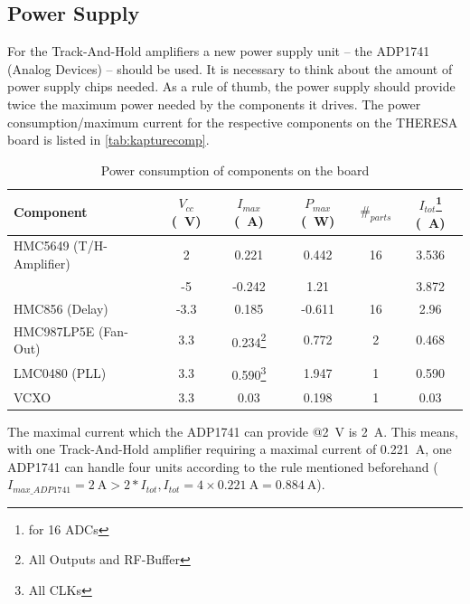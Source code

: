 

\subsection{Power Supply}
For the Track-And-Hold amplifiers a new power supply unit -- the ADP1741 (Analog Devices) -- should be used. It is necessary to think about the amount of power supply chips needed. As a rule of thumb, the power supply should provide twice the maximum power needed by the components it drives. The power consumption/maximum current for the respective components on the THERESA board is listed in \autoref{tab:kapturecomp}. 
\begin{table}[tbh!]
	\caption{Power consumption of components on the board}
	\label{tab:kapturecomp}
	\begin{minipage}{\textwidth}
		\centering
		\begin{tabularx}{\textwidth}{XSSSSS}
			\toprule
			\textbf{Component} & \textbf{$V_{cc}$ (\SI{}{\volt})} & \textbf{$I_{max}$ (\SI{}{\ampere})} & \textbf{$P_{max}$ (\SI{}{\watt})} & $\#_{parts}$ & \textbf{$I_{tot}$}\footnote{for 16 ADCs} (\SI{}{\ampere})\\
				\midrule
			HMC5649 (T/H-Amplifier) 	& 2	  	& 0.221 	 & 0.442 & 16 & 3.536\\
									& -5  	& -0.242 & 1.21 &  & 3.872\\
			HMC856 (Delay) 			& -3.3	& 0.185 & -0.611 & 16 & 2.96\\
			HMC987LP5E (Fan-Out) 	& 3.3 	& 0.234\footnote{All Outputs and RF-Buffer} & 0.772 & 2 & 0.468\\
			LMC0480 (PLL) 			& 3.3 	& 0.590\footnote{All CLKs} & 1.947 & 1 & 0.590\\
			VCXO 					& 3.3 	& 0.03 & 0.198 & 1 & 0.03\\
			\bottomrule
		\end{tabularx}
	\end{minipage}
\end{table}

The maximal current which the ADP1741 can provide @\SI{2}{\volt} is \SI{2}{\ampere}. This means, with one Track-And-Hold amplifier requiring a maximal current of \SI{0.221}{\ampere}, one ADP1741 can handle four units according to the rule mentioned beforehand ($I_{max\_ADP1741} = \SI{2}{\ampere} > 2 * I_{tot}, I_{tot} = 4 \times \SI{0.221}{\ampere} =  \SI{0.884}{\ampere}$).



